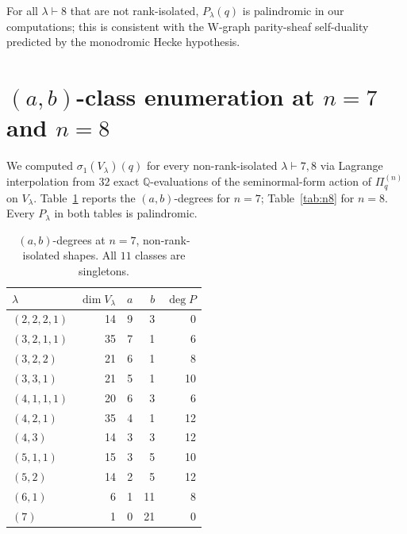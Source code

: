 \documentclass[11pt]{article}
\theoremstyle{definition}
\theoremstyle{remark}
\newcommand{\bbQ}{\mathbb{Q}}
\newcommand{\Pq}{\Pi_q}
\begin{document}
For all $\lambda \vdash 8$ that are not rank-isolated, $P_\lambda(q)$
is palindromic in our computations; this is consistent with the
W-graph parity-sheaf self-duality predicted by the monodromic Hecke
hypothesis.

\section{$(a,b)$-class enumeration at $n=7$ and $n=8$}

We computed $\sigma_1(V_\lambda)(q)$ for every non-rank-isolated
$\lambda \vdash 7, 8$ via Lagrange interpolation from $32$ exact
$\bbQ$-evaluations of the seminormal-form action of $\Pq^{(n)}$ on
$V_\lambda$.  Table~\ref{tab:n7} reports the $(a,b)$-degrees for
$n=7$; Table~\ref{tab:n8} for $n=8$.  Every $P_\lambda$ in both
tables is palindromic.

\begin{table}[ht]
\centering
\begin{tabular}{lrrrr}
\hline
$\lambda$ & $\dim V_\lambda$ & $a$ & $b$ & $\deg P$ \\
\hline
$(2,2,2,1)$  & 14 & 9 & 3 &  0 \\
$(3,2,1,1)$  & 35 & 7 & 1 &  6 \\
$(3,2,2)$    & 21 & 6 & 1 &  8 \\
$(3,3,1)$    & 21 & 5 & 1 & 10 \\
$(4,1,1,1)$  & 20 & 6 & 3 &  6 \\
$(4,2,1)$    & 35 & 4 & 1 & 12 \\
$(4,3)$      & 14 & 3 & 3 & 12 \\
$(5,1,1)$    & 15 & 3 & 5 & 10 \\
$(5,2)$      & 14 & 2 & 5 & 12 \\
$(6,1)$      &  6 & 1 &11 &  8 \\
$(7)$        &  1 & 0 &21 &  0 \\
\hline
\end{tabular}
\caption{$(a,b)$-degrees at $n=7$, non-rank-isolated shapes.  All
$11$ classes are singletons.}
\label{tab:n7}
\end{table}
\end{document}
